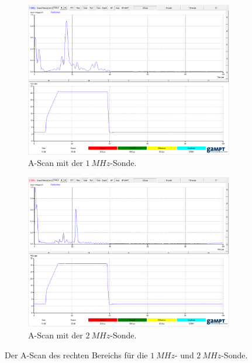 \begin{figure}
  \centering
  
  \begin{subfigure}{0.49\columnwidth}
  \centering
  \includegraphics[width=\textwidth]{pictures/boob_rechts_1MHz.png}
  \caption{A-Scan mit der $\qty{1}{MHz}$-Sonde.}
  \label{fig:boob_rechts_1}
  \end{subfigure}
  \hfill
  \begin{subfigure}{0.49\columnwidth}
  \centering
  \includegraphics[width=\textwidth]{pictures/boob_rechts_2MHz.png}
  \caption{A-Scan mit der $\qty{2}{MHz}$-Sonde.}
  \label{fig:boob_rechts_2}
  \end{subfigure}

  \caption{Der A-Scan des rechten Bereichs für die $\qty{1}{MHz}$- und $\qty{2}{MHz}$-Sonde.}
  \label{fig:boob_rechts}
\end{figure}